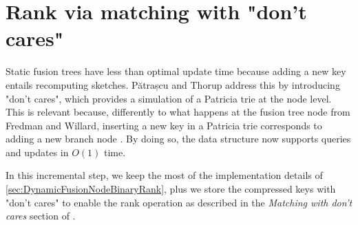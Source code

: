 \newpage
\section{Rank via matching with "don't cares"} \label{sec:rankWithDontCares}

Static fusion trees have less than optimal update time because adding a new key entails recomputing sketches. Pătrașcu and Thorup address this by introducing "don't cares", which provides a simulation of a Patricia trie at the node level. This is relevant because, differently to what happens at the fusion tree node from Fredman and Willard, inserting a new key in a Patricia trie corresponds to adding a new branch node \cite{patrascu2014dynamic}. By doing so, the data structure now supports queries and updates in $O(1)$ time.

In this incremental step, we keep the most of the implementation details of \ref{sec:DynamicFusionNodeBinaryRank}, plus we store the compressed keys with "don't cares" to enable the rank operation as described in the \textit{Matching with don't cares} section of \cite{patrascu2014dynamic}.

